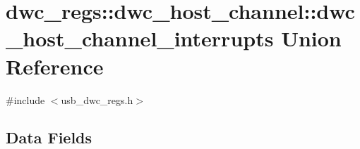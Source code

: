 \hypertarget{uniondwc__regs_1_1dwc__host__channel_1_1dwc__host__channel__interrupts}{\section{dwc\-\_\-regs\-:\-:dwc\-\_\-host\-\_\-channel\-:\-:dwc\-\_\-host\-\_\-channel\-\_\-interrupts Union Reference}
\label{uniondwc__regs_1_1dwc__host__channel_1_1dwc__host__channel__interrupts}
}


{\ttfamily \#include $<$usb\-\_\-dwc\-\_\-regs.\-h$>$}

\subsection*{Data Fields}
